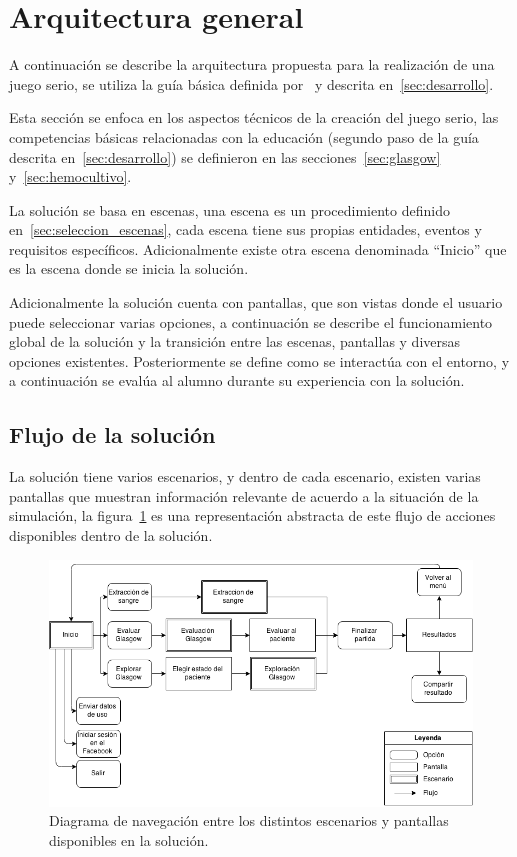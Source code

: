
\section{Arquitectura general}
\label{sec:solucion}

A continuación se describe la arquitectura propuesta para la realización de una
juego serio, se utiliza la guía básica definida por~\cite{pereira2009design} y
descrita en~\ref{sec:desarrollo}.

Esta sección se enfoca en los aspectos técnicos de la creación del juego serio,
las competencias básicas relacionadas con la educación (segundo paso de la guía
descrita en~\ref{sec:desarrollo}) se definieron en las
secciones~\ref{sec:glasgow} y~\ref{sec:hemocultivo}.

La solución se basa en escenas, una escena es un procedimiento definido
en~\ref{sec:seleccion_escenas}, cada escena tiene sus propias entidades, eventos
y requisitos específicos. Adicionalmente existe otra escena denominada
\enquote{Inicio} que es la escena donde se inicia la solución.

Adicionalmente la solución cuenta con pantallas, que son vistas donde el usuario
puede seleccionar varias opciones, a continuación se describe el funcionamiento
global de la solución y la transición entre las escenas, pantallas y diversas
opciones existentes. Posteriormente se define como se interactúa con el entorno,
y a continuación se evalúa al alumno durante su experiencia con la solución.

\subsection{Flujo de la solución}

La solución tiene varios escenarios, y dentro de cada escenario, existen varias
pantallas que muestran información relevante de acuerdo a la situación de la
simulación, la figura~\ref{fig:grafo_estados} es una representación abstracta
de este flujo de acciones disponibles dentro de la solución.

\begin{figure}[H] 
\centering 
\includegraphics[scale=0.5]{solucion/images/grafo_escenas.png}
\caption{Diagrama de navegación entre los distintos escenarios y pantallas
    disponibles en la solución.}
\label{fig:grafo_estados}
\end{figure}

